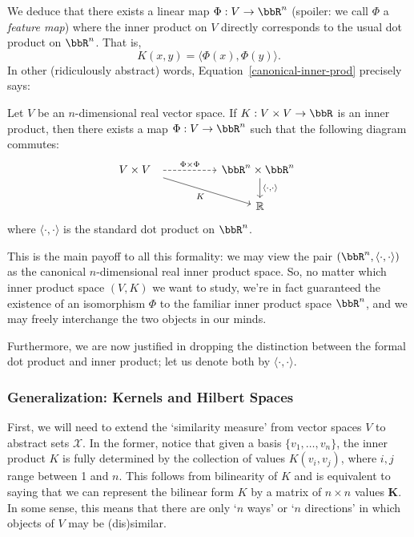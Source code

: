 \documentclass[twoside,11pt]{homework}
\begin{document}
\begin{multicols}{2}
We deduce that there exists a linear map $\Phi: V \to \bbR^n$ (spoiler: we call $\Phi$
a \emph{feature map}) where the inner product on $V$ directly corresponds to the usual
dot product on $\bbR^n$. That is,
\begin{equation}\label{canonical-inner-prod}
  K(x,y) = \langle \Phi(x), \Phi(y)\rangle.
\end{equation}
In other (ridiculously abstract) words, Equation~\ref{canonical-inner-prod} precisely says:
\begin{proposition}\label{finite-IP}
  Let $V$ be an $n$-dimensional real vector space. If $K : V \times V \to \bbR$ is an
  inner product, then there exists a map $\Phi: V \to \bbR^n$ such that the following
  diagram commutes:
  \[\begin{tikzcd}
  V \times V\ \  \arrow[dashed, rr, "\Phi \times \Phi"] \arrow[drr, "K"'] & &
  \bbR^n \times \bbR^n \ \arrow[d, "{\langle\cdot,\cdot \rangle}"] \\
  & & \mathbb{R}
\end{tikzcd}
\]
  where $\langle \cdot, \cdot \rangle$ is the standard dot product on $\bbR^n$.
\end{proposition}
This is the main payoff to all this formality: we may view the pair
$(\bbR^n, \langle\cdot,\cdot\rangle)$ as the canonical $n$-dimensional real inner product
space. So, no matter which inner product space $(V,K)$ we want to study, we're in fact
guaranteed the existence of an isomorphism $\Phi$ to the familiar inner product space
$\bbR^n$, and we may freely interchange the two objects in our minds.

Furthermore, we are now justified in dropping the distinction between the formal dot
product and inner product; let us denote both by $\langle \cdot, \cdot\rangle$.

\subsubsection{Generalization: Kernels and Hilbert Spaces}
First, we will need to extend the `similarity measure' from vector spaces $V$ to
abstract sets $\mathcal{X}$. In the former, notice that given a basis
$\{v_1,\dotsc, v_n\}$, the inner product $K$ is fully determined by the collection
of values $K(v_i,v_j)$, where $i,j$ range between 1 and $n$. This follows from
bilinearity of $K$ and is equivalent to saying that we can represent the bilinear
form $K$ by a matrix of $n\times n$ values $\mathbf{K}$. In some sense, this means
that there are only `$n$ ways' or `$n$ directions' in which objects of $V$ may be
(dis)similar.


\end{multicols}
\end{document}
